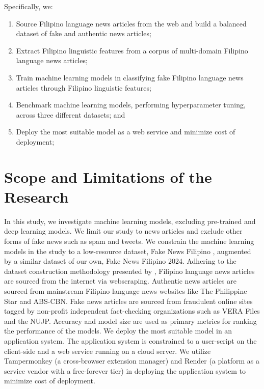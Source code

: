 Specifically, we:

\begin{enumerate}
   \item Source Filipino language news articles from the web and build a balanced dataset of fake and authentic news articles;
   \item Extract Filipino linguistic features from a corpus of multi-domain Filipino language news articles;
   \item Train machine learning models in classifying fake Filipino language news articles through Filipino linguistic features;
   \item Benchmark machine learning models, performing hyperparameter tuning, across three different datasets; and
   \item Deploy the most suitable model as a web service and minimize cost of deployment;
\end{enumerate}

\section{Scope and Limitations of the Research}
\label{sec:scopelimitations}

In this study, we investigate machine learning models, excluding pre-trained and deep learning models. We limit our study to news articles and exclude other forms of fake news such as spam and tweets. We constrain the machine learning models in the study to a low-resource dataset, Fake News Filipino \cite{fake-news-filipino}, augmented by a similar dataset of our own, Fake News Filipino 2024. Adhering to the dataset construction methodology presented by , Filipino language news articles are sourced from the internet via webscraping. Authentic news articles are sourced from mainstream Filipino language news websites like The Philippine Star and ABS-CBN. Fake news articles are sourced from fraudulent online sites tagged by non-profit independent fact-checking organizations such as VERA Files and the NUJP. Accuracy and model size are used as primary metrics for ranking the performance of the models. We deploy the most suitable model in an application system. The application system is constrained to a user-script on the client-side and a web service running on a cloud server. We utilize Tampermonkey (a cross-browser extension manager) and Render (a platform as a service vendor with a free-forever tier) in deploying the application system to minimize cost of deployment.

